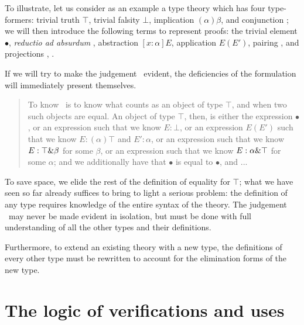 \documentclass[main.tex]{subfiles}
\begin{document}
To illustrate, let us consider as an example a type theory which has four
type-formers: trivial truth $\top$, trivial falsity $\bot$, implication
$(\alpha)\beta$, and conjunction \product\alpha\beta; we will then introduce
the following terms to represent proofs: the trivial element $\bullet$,
\emph{reductio ad absurdum} , abstraction $[x:\alpha]E$,
application $E(E')$, pairing , and projections , .

If we will try to make the judgement \type\top\ evident, the deficiencies of
the formulation will immediately present themselves.

\begin{quote}
To know \type\top\ is to know what counts as an object of type $\top$, and when
two such objects are equal. An object of type $\top$, then, is either the
expression $\bullet$, or an expression  such that we know
$E:\bot$, or an expression $E(E')$ such that we know $E:(\alpha)\top$ and
$E':\alpha$, or an expression  such that we know $E:\top\&\beta$
for some $\beta$, or an expression  such that we know
$E:\alpha\&\top$ for some $\alpha$; and we additionally have that $\bullet$
is equal to $\bullet$, and ...
\end{quote}

To save space, we elide the rest of the definition of equality for $\top$; what
we have seen so far already suffices to bring to light a serious problem: the
definition of any type requires knowledge of the entire syntax of the theory.
The judgement \type\alpha\ may never be made evident in isolation, but must be
done with full understanding of all the other types and their definitions.

Furthermore, to extend an existing theory with a new type, the definitions of
every other type must be rewritten to account for the elimination forms of the
new type.

\section{The logic of verifications and uses}
\end{document}
